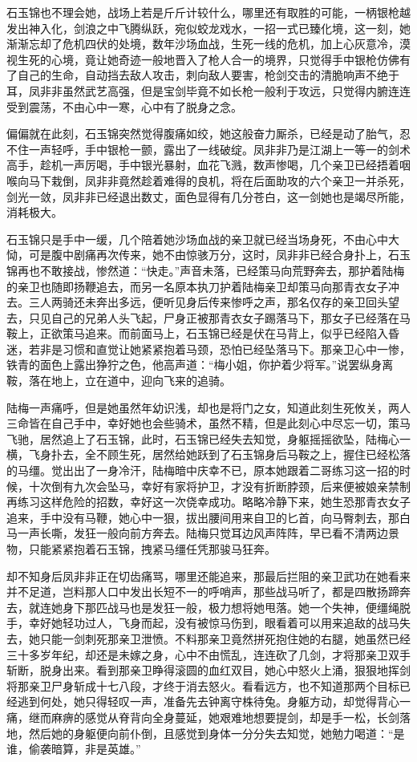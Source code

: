石玉锦也不理会她，战场上若是斤斤计较什么，哪里还有取胜的可能，一柄银枪越发出神入化，剑浪之中飞腾纵跃，宛似蛟龙戏水，一招一式已臻化境，这一刻，她渐渐忘却了危机四伏的处境，数年沙场血战，生死一线的危机，加上心灰意冷，漠视生死的心境，竟让她奇迹一般地晋入了枪人合一的境界，只觉得手中银枪仿佛有了自己的生命，自动挡去敌人攻击，刺向敌人要害，枪剑交击的清脆响声不绝于耳，凤非非虽然武艺高强，但是宝剑毕竟不如长枪一般利于攻远，只觉得内腑连连受到震荡，不由心中一寒，心中有了脱身之念。

偏偏就在此刻，石玉锦突然觉得腹痛如绞，她这般奋力厮杀，已经是动了胎气，忍不住一声轻呼，手中银枪一颤，露出了一线破绽。凤非非乃是江湖上一等一的剑术高手，趁机一声厉喝，手中银光暴射，血花飞溅，数声惨喝，几个亲卫已经捂着咽喉向马下栽倒，凤非非竟然趁着难得的良机，将在后面助攻的六个亲卫一并杀死，剑光一敛，凤非非已经退出数丈，面色显得有几分苍白，这一剑她也是竭尽所能，消耗极大。

石玉锦只是手中一缓，几个陪着她沙场血战的亲卫就已经当场身死，不由心中大恸，可是腹中剧痛再次传来，她不由惊骇万分，这时，凤非非已经合身扑上，石玉锦再也不敢接战，惨然道：“快走。”声音未落，已经策马向荒野奔去，那护着陆梅的亲卫也随即扬鞭追去，而另一名原本执刀护着陆梅亲卫却策马向那青衣女子冲去。三人两骑还未奔出多远，便听见身后传来惨呼之声，那名仅存的亲卫回头望去，只见自己的兄弟人头飞起，尸身正被那青衣女子踢落马下，那女子已经落在马鞍上，正欲策马追来。而前面马上，石玉锦已经是伏在马背上，似乎已经陷入昏迷，若非是习惯和直觉让她紧紧抱着马颈，恐怕已经坠落马下。那亲卫心中一惨，铁青的面色上露出狰狞之色，他高声道：“梅小姐，你护着少将军。”说罢纵身离鞍，落在地上，立在道中，迎向飞来的追骑。

陆梅一声痛呼，但是她虽然年幼识浅，却也是将门之女，知道此刻生死攸关，两人三命皆在自己手中，幸好她也会些骑术，虽然不精，但是此刻心中尽忘一切，策马飞驰，居然追上了石玉锦，此时，石玉锦已经失去知觉，身躯摇摇欲坠，陆梅心一横，飞身扑去，全不顾生死，居然给她跃到了石玉锦身后马鞍之上，握住已经松落的马缰。觉出出了一身冷汗，陆梅暗中庆幸不已，原本她跟着二哥练习这一招的时候，十次倒有九次会坠马，幸好有家将护卫，才没有折断脖颈，后来便被娘亲禁制再练习这样危险的招数，幸好这一次侥幸成功。略略冷静下来，她生恐那青衣女子追来，手中没有马鞭，她心中一狠，拔出腰间用来自卫的匕首，向马臀刺去，那白马一声长嘶，发狂一般向前方奔去。陆梅只觉耳边风声阵阵，早已看不清两边景物，只能紧紧抱着石玉锦，拽紧马缰任凭那骏马狂奔。

却不知身后凤非非正在切齿痛骂，哪里还能追来，那最后拦阻的亲卫武功在她看来并不足道，岂料那人口中发出长短不一的呼哨声，那些战马听了，都是四散扬蹄奔去，就连她身下那匹战马也是发狂一般，极力想将她甩落。她一个失神，便缰绳脱手，幸好她轻功过人，飞身而起，没有被惊马伤到，眼看着可以用来追敌的战马失去，她只能一剑刺死那亲卫泄愤。不料那亲卫竟然拼死抱住她的右腿，她虽然已经三十多岁年纪，却还是未嫁之身，心中不由慌乱，连连砍了几剑，才将那亲卫双手斩断，脱身出来。看到那亲卫睁得滚圆的血红双目，她心中怒火上涌，狠狠地挥剑将那亲卫尸身斩成十七八段，才终于消去怒火。看看远方，也不知道那两个目标已经逃到何处，她只得轻叹一声，准备先去钟离守株待兔。身躯方动，却觉得背心一痛，继而麻痹的感觉从脊背向全身蔓延，她艰难地想要提剑，却是手一松，长剑落地，然后她的身躯便向前仆倒，且感觉到身体一分分失去知觉，她勉力喝道：“是谁，偷袭暗算，非是英雄。”

